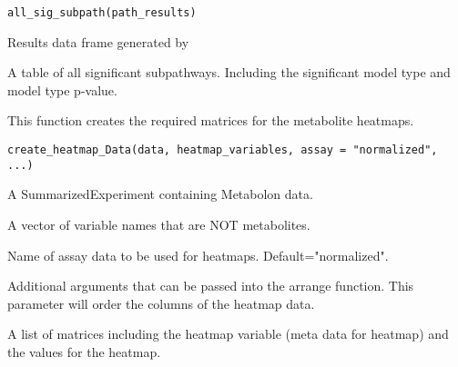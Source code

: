 \documentclass[a4paper]{book}
\begin{document}
%
\begin{Usage}
\begin{verbatim}
all_sig_subpath(path_results)
\end{verbatim}
\end{Usage}
%
\begin{Arguments}
\begin{ldescription}
\item[\code{path\_results}] Results data frame generated by 
\end{ldescription}
\end{Arguments}
%
\begin{Value}
A table of all significant subpathways. Including the significant model type
and model type p-value.
\end{Value}
%
\begin{Description}
This function creates the required matrices for the metabolite heatmaps.
\end{Description}
%
\begin{Usage}
\begin{verbatim}
create_heatmap_Data(data, heatmap_variables, assay = "normalized", ...)
\end{verbatim}
\end{Usage}
%
\begin{Arguments}
\begin{ldescription}
\item[\code{data}] A SummarizedExperiment containing Metabolon data.

\item[\code{heatmap\_variables}] A vector of variable names that are NOT metabolites.

\item[\code{assay}] Name of assay data to be used for heatmaps. Default="normalized".

\item[\code{...}] Additional arguments that can be passed into the arrange function.
This parameter will order the columns of the heatmap data.
\end{ldescription}
\end{Arguments}
%
\begin{Value}
A list of matrices including the heatmap variable (meta data for heatmap)
and the values for the heatmap.
\end{Value}
\end{document}
